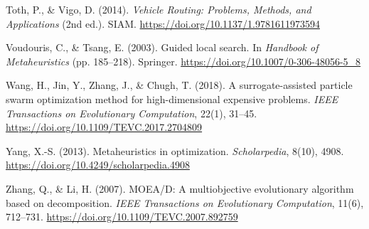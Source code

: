 \documentclass[conference]{IEEEtran}
\begin{document}
\begin{thebibliography}{99}
Toth, P., \& Vigo, D. (2014). \textit{Vehicle Routing: Problems, Methods, and Applications} (2nd ed.). SIAM. \url{https://doi.org/10.1137/1.9781611973594}

Voudouris, C., \& Tsang, E. (2003). Guided local search. In \textit{Handbook of Metaheuristics} (pp. 185–218). Springer. \url{https://doi.org/10.1007/0-306-48056-5_8}

Wang, H., Jin, Y., Zhang, J., \& Chugh, T. (2018). A surrogate-assisted particle swarm optimization method for high-dimensional expensive problems. \textit{IEEE Transactions on Evolutionary Computation}, 22(1), 31–45. \url{https://doi.org/10.1109/TEVC.2017.2704809}

Yang, X.-S. (2013). Metaheuristics in optimization. \textit{Scholarpedia}, 8(10), 4908. \url{https://doi.org/10.4249/scholarpedia.4908}

Zhang, Q., \& Li, H. (2007). MOEA/D: A multiobjective evolutionary algorithm based on decomposition. \textit{IEEE Transactions on Evolutionary Computation}, 11(6), 712–731. \url{https://doi.org/10.1109/TEVC.2007.892759}

\end{thebibliography}
\end{document}
